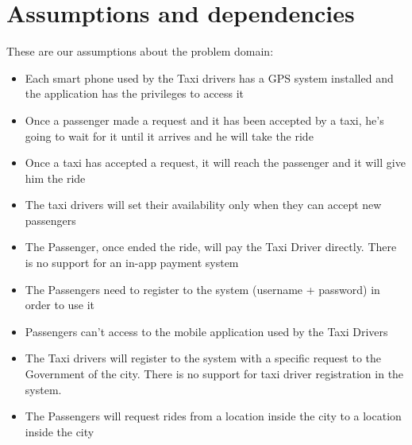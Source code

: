 \section{Assumptions and dependencies}
These are our assumptions about the problem domain:
\begin{itemize}
\item Each smart phone used by the Taxi drivers has a GPS system installed and the application has the privileges to access  it
\item Once a passenger made a request and it has been accepted by a taxi, he's going to wait for it until it arrives and he will take the ride
\item Once a taxi has accepted a request, it will reach the passenger and it will give him the ride
\item The taxi drivers will set their availability only when they can accept new passengers
\item The Passenger, once ended the ride, will pay the Taxi Driver directly. There is no support for an in-app payment system
\item The Passengers need to register to the system (username + password) in order to use it
\item Passengers can't access to the mobile application used by the Taxi Drivers
\item The Taxi drivers will register to the system with a specific request to the Government of the city. There is no support for taxi driver registration in the system.

\item The Passengers will request rides from a location inside the city to a location inside the city
\end{itemize}